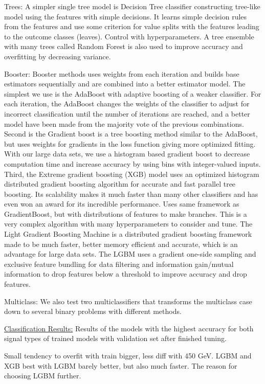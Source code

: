 \documentclass[a4paper, american, 12pt]{report}
\begin{document}
	Trees: A simpler single tree model is Decision Tree classifier constructing tree-like model using the features with simple decisions. It learns simple decision rules from the features and use some criterion for value splits with the features leading to the outcome classes (leaves). Control with hyperparameters. A tree ensemble with many trees called Random Forest is also used to improve accuracy and overfitting by decreasing variance.
	
	Booster: Booster methods uses weights from each iteration and builds base estimators sequentially and are combined into a better estimator model. The simplest we use is the AdaBoost with adaptive boosting of a weaker classifier. For each iteration, the AdaBoost changes the weights of the classifier to adjust for incorrect classification until the number of iterations are reached, and a better model have been made from the majority vote of the previous combinations. Second is the Gradient boost is a tree boosting method similar to the AdaBoost, but uses weights for gradients in the loss function giving more optimized fitting. With our large data sets, we use a histogram based gradient boost to decrease computation time and increase accuracy by using bins with integer-valued inputs. Third, the Extreme gradient boosting (XGB) model uses an optimized histogram distributed gradient boosting algorithm for accurate and fast parallel tree boosting. Its scalability makes it much faster than many other classifiers and has even won an award for its incredible performance. Uses same framework as GradientBoost, but with distributions of features to make branches. This is a very complex algorithm with many hyperparameters to consider and tune. The Light Gradient Boosting Machine is a distributed gradient boosting framework made to be much faster, better memory efficient and accurate, which is an advantage for large data sets. The LGBM uses a gradient one-side sampling and exclusive feature bundling for data filtering and information gain/mutual information to drop features below a threshold to improve accuracy and drop features.
	
	Multiclass: We also test two multiclassifiers that transforms the multiclass case down to several binary problems with different methods. 
	
	
	\underline{Classification Results:}
	Results of the models with the highest accuracy for both signal types of trained models with validation set after finished tuning. 
	
	 Small tendency to overfit with train bigger, less diff with 450 GeV. LGBM and XGB best with LGBM barely better, but also much faster. The reason for choosing LGBM further.
	
\end{document}
